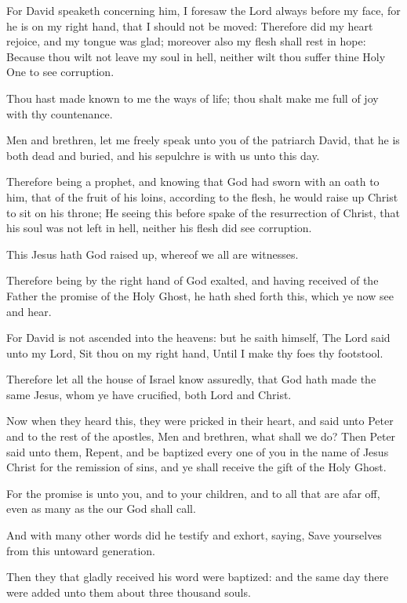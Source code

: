 \verse For David speaketh concerning him, I foresaw the Lord always before my face, for he is on my right hand, that I should not be moved: \verse Therefore did my heart rejoice, and my tongue was glad; moreover also my flesh shall rest in hope: \verse Because thou wilt not leave my soul in hell, neither wilt thou suffer thine Holy One to see corruption.

\verse Thou hast made known to me the ways of life; thou shalt make me full of joy with thy countenance.

\verse Men and brethren, let me freely speak unto you of the patriarch David, that he is both dead and buried, and his sepulchre is with us unto this day.

\verse Therefore being a prophet, and knowing that God had sworn with an oath to him, that of the fruit of his loins, according to the flesh, he would raise up Christ to sit on his throne; \verse He seeing this before spake of the resurrection of Christ, that his soul was not left in hell, neither his flesh did see corruption.

\verse This Jesus hath God raised up, whereof we all are witnesses.

\verse Therefore being by the right hand of God exalted, and having received of the Father the promise of the Holy Ghost, he hath shed forth this, which ye now see and hear.

\verse For David is not ascended into the heavens: but he saith himself, The Lord said unto my Lord, Sit thou on my right hand, \verse Until I make thy foes thy footstool.

\verse Therefore let all the house of Israel know assuredly, that God hath made the same Jesus, whom ye have crucified, both Lord and Christ.

\verse Now when they heard this, they were pricked in their heart, and said unto Peter and to the rest of the apostles, Men and brethren, what shall we do?  \verse Then Peter said unto them, Repent, and be baptized every one of you in the name of Jesus Christ for the remission of sins, and ye shall receive the gift of the Holy Ghost.

\verse For the promise is unto you, and to your children, and to all that are afar off, even as many as the \LORD our God shall call.

\verse And with many other words did he testify and exhort, saying, Save yourselves from this untoward generation.

\verse Then they that gladly received his word were baptized: and the same day there were added unto them about three thousand souls.

